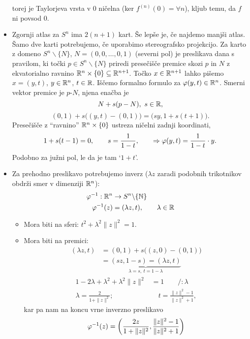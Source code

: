 \begin{zgled}
\begin{itemize}
{\begin{itemize}
{\[					\]
					torej je Taylorjeva vrsta v 0 ni\v celna (ker $f^{(n)} (0) = \forall n$), kljub temu, da $f$ ni povsod $0$.}
			\end{itemize}}
		\item{Zgornji atlas za $S^n$ ima $2(n+1)$ kart. \v Se lep\v se je, \v ce najdemo manj\v si atlas. \v Samo dve karti potrebujemo,
			\v ce uporabimo stereografsko projekcijo. Za karto z domeno $S^n\backslash\{N\}$, $N = (0,0,\ldots,0,1)$ (severni
			pol) je preslikava dana s pravilom, ki to\v cki $p \in S^n\backslash\{N\}$ priredi prese\v ci\v s\v ce premice skozi $p$ in
			$N$ z ekvatorialno ravnino $\mathbb{R}^n \times \{0\} \subseteq \mathbb{R}^{n+1}$. To\v cko $x \in \mathbb{R}^{n+1}$ lahko pi\v semo $x = (y,t)$,
			$y \in \mathbb{R}^n$, $t \in \mathbb{R}$. I\v s\v cemo formalno formulo za $\varphi(y,t) \in \mathbb{R}^n$. Smerni vektor premice je $p$-$N$, njena
			ena\v cba je
			\[
				N + s(p - N),\ s \in \mathbb{R},
			\]\[
				(0,1) + s \big((y,t) - (0,1)\big) = \big(sy, 1 + s(t+1)\big).
			\]
			Prese\v ci\v s\v ce z "`ravnino"' $\mathbb{R}^n \times \{0\}$ ustreza ni\v celni zadnji koordinati,
			\[
				1 + s(t-1) = 0, \qquad s = \frac{1}{1 - t},\qquad \Rightarrow \varphi(y,t) = \frac{1}{1 - t} \cdot y.
			\]
			Podobno za ju\v zni pol, le da je tam `$1 + t$'.}
		\item{Za prehodno preslikavo potrebujemo inverz ($\lambda z$ zaradi podobnih trikotnikov obdr\v zi smer v dimenziji $\mathbb{R}^n$):
			\begin{align*}
				\varphi^{-1} : \mathbb{R}^n &\to S^n \backslash \{\mathbb{N}\} \\
				\varphi^{-1} (z) &= (\lambda z, t), \qquad \lambda \in \mathbb{R}
			\end{align*}
			\begin{itemize}
				\item{Mora biti na sferi: $t^2 + \lambda^2\|z\|^2 = 1$.}
				\item{Mora biti na premici:
					\begin{align*}
						(\lambda z, t) &= (0,1) + s\big((z,0) - (0,1)\big) \\
						&= \underbrace{(sz, 1 - s) = (\lambda z, t)}_{\lambda = s,\ t = 1 - \lambda}
					\end{align*}
					\begin{align*}
						1 - 2\lambda + \lambda^2 + \lambda^2\|z\|^2 &= 1\qquad \slash :\lambda \\
						\lambda = \frac{2}{1 + \|z\|^2}; &\quad t = \frac{\|z\|^2 - 1}{\|z\|^2 + 1},
					\end{align*}
					kar pa nam na koncu vrne inverzno preslikavo
					\[
						\varphi^{-1}(z) = \bigg(\frac{2z}{1 + \|z\|^2}, \frac{\|z\|^2 - 1}{\|z\|^2 + 1}\bigg)
\]}
\end{itemize}}
\end{itemize}
\end{zgled}
